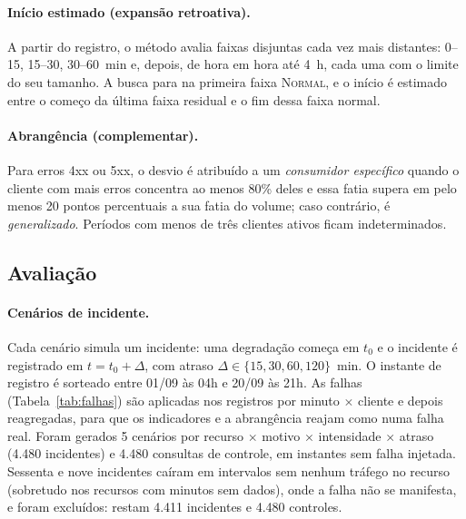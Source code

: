 \documentclass[sigconf,nonacm]{acmart}
\newcommand{\Normal}{\textsc{Normal}\xspace}
\begin{document}
\paragraph{Início estimado (expansão retroativa).} A partir do registro, o método avalia faixas disjuntas cada vez mais distantes: 0--15, 15--30, 30--60~min e, depois, de hora em hora até 4~h, cada uma com o limite do seu tamanho. A busca para na primeira faixa \Normal, e o início é estimado entre o começo da última faixa residual e o fim dessa faixa normal.

\paragraph{Abrangência (complementar).} Para erros 4xx ou 5xx, o desvio é atribuído a um \emph{consumidor específico} quando o cliente com mais erros concentra ao menos 80\% deles e essa fatia supera em pelo menos 20 pontos percentuais a sua fatia do volume; caso contrário, é \emph{generalizado}. Períodos com menos de três clientes ativos ficam indeterminados.

\subsection{Avaliação}

\paragraph{Cenários de incidente.} Cada cenário simula um incidente: uma degradação começa em $t_0$ e o incidente é registrado em $t=t_0+\Delta$, com atraso $\Delta\in\{15,30,60,120\}$~min. O instante de registro é sorteado entre 01/09 às 04h e 20/09 às 21h. As falhas (Tabela~\ref{tab:falhas}) são aplicadas nos registros por minuto $\times$ cliente e depois reagregadas, para que os indicadores e a abrangência reajam como numa falha real. Foram gerados 5 cenários por recurso $\times$ motivo $\times$ intensidade $\times$ atraso (4.480 incidentes) e 4.480 consultas de controle, em instantes sem falha injetada. Sessenta e nove incidentes caíram em intervalos sem nenhum tráfego no recurso (sobretudo nos recursos com minutos sem dados), onde a falha não se manifesta, e foram excluídos: restam 4.411 incidentes e 4.480 controles.
\end{document}
